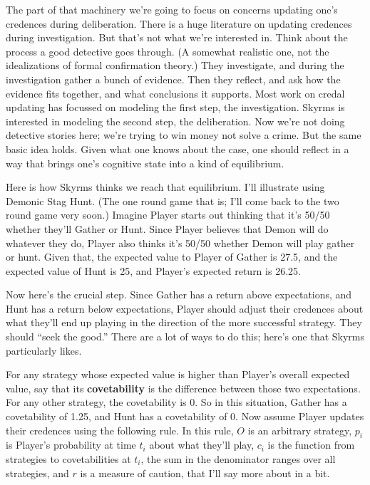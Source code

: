 \documentclass[
  12pt,
]{article}
\begin{document}
The part of that machinery we're going to focus on concerns updating
one's credences during deliberation. There is a huge literature on
updating credences during investigation. But that's not what we're
interested in. Think about the process a good detective goes through. (A
somewhat realistic one, not the idealizations of formal confirmation
theory.) They investigate, and during the investigation gather a bunch
of evidence. Then they reflect, and ask how the evidence fits together,
and what conclusions it supports. Most work on credal updating has
focussed on modeling the first step, the investigation. Skyrms is
interested in modeling the second step, the deliberation. Now we're not
doing detective stories here; we're trying to win money not solve a
crime. But the same basic idea holds. Given what one knows about the
case, one should reflect in a way that brings one's cognitive state into
a kind of equilibrium.

Here is how Skyrms thinks we reach that equilibrium. I'll illustrate
using Demonic Stag Hunt. (The one round game that is; I'll come back to
the two round game very soon.) Imagine Player starts out thinking that
it's 50/50 whether they'll Gather or Hunt. Since Player believes that
Demon will do whatever they do, Player also thinks it's 50/50 whether
Demon will play gather or hunt. Given that, the expected value to Player
of Gather is 27.5, and the expected value of Hunt is 25, and Player's
expected return is 26.25.

Now here's the crucial step. Since Gather has a return above
expectations, and Hunt has a return below expectations, Player should
adjust their credences about what they'll end up playing in the
direction of the more successful strategy. They should ``seek the
good.'' There are a lot of ways to do this; here's one that Skyrms
particularly likes.

For any strategy whose expected value is higher than Player's overall
expected value, say that its \textbf{covetability} is the difference
between those two expectations. For any other strategy, the covetability
is 0. So in this situation, Gather has a covetability of 1.25, and Hunt
has a covetability of 0. Now assume Player updates their credences using
the following rule. In this rule, \(O\) is an arbitrary strategy,
\(p_i\) is Player's probability at time \(t_i\) about what they'll play,
\(c_i\) is the function from strategies to covetabilities at \(t_i\),
the sum in the denominator ranges over all strategies, and \(r\) is a
measure of caution, that I'll say more about in a bit.
\end{document}
